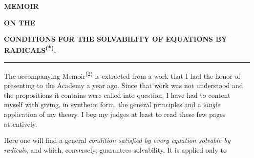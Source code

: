 
\providecommand{\GalSourcePageStart}[4]{}%
\providecommand{\GalSourcePageBoundary}[4]{\space}%
\providecommand{\GalPrintedError}[2]{#1}%
\providecommand{\GalPrintedOmission}[1]{}%
\providecommand{\GalSourceError}[2]{#1}%
\providecommand{\GalWitnessVariant}[2]{#1}%
\providecommand{\GalControlReading}[2]{#1}%
\providecommand{\GalSourceErrorMark}[1]{}%
\providecommand{\GalProofGapMark}[1]{}%
\providecommand{\GalControlDefect}[2]{#1}%
\providecommand{\GalHistoricalNote}[1]{\par\smallskip{\footnotesize #1\par}}%
\providecommand{\GalArticleEndRule}{\par\smallskip\begin{center}\rule{0.18\linewidth}{0.4pt}\end{center}}%

\GalSourcePageStart{062}{L0061}{33}{33}

\begin{center}
{\Large\bfseries MEMOIR\par}
\vspace{0.35em}
{\small\bfseries ON THE\par}
\vspace{0.35em}
{\large\bfseries CONDITIONS FOR THE SOLVABILITY OF EQUATIONS BY RADICALS\textsuperscript{(*)}.\par}
\vspace{0.8em}
\rule{0.12\linewidth}{0.4pt}
\end{center}

The accompanying Memoir\textsuperscript{(2)} is extracted from a work that I had
the honor of presenting to the Academy a year ago. Since that work was not
understood and the propositions it contains were called into question, I have
had to content myself with giving, in synthetic form, the general principles
and a \emph{single} application of my theory. I beg my judges at least to read
these few pages attentively.

Here one will find a general \emph{condition satisfied by every equation solvable
by radicals}, and which, conversely, guarantees solvability. It is applied only to

